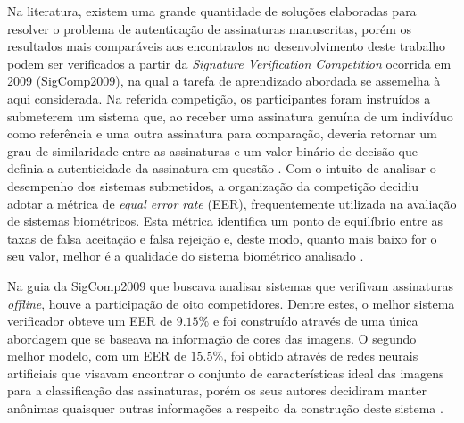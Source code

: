 
Na literatura, existem uma grande quantidade de soluções elaboradas para resolver o problema de autenticação de assinaturas manuscritas, porém os resultados mais comparáveis aos encontrados no desenvolvimento deste trabalho podem ser verificados a partir da \emph{Signature Verification Competition} ocorrida em 2009 (SigComp2009), na qual a tarefa de aprendizado abordada se assemelha à aqui considerada. Na referida competição, os participantes foram instruídos a submeterem um sistema que, ao receber uma assinatura genuína de um indivíduo como referência e uma outra assinatura para comparação, deveria retornar um grau de similaridade entre as assinaturas e um valor binário de decisão que definia a autenticidade da assinatura em questão \cite{icdar2009}. Com o intuito de analisar o desempenho dos sistemas submetidos, a organização da competição decidiu adotar a métrica de \emph{equal error rate} (EER), frequentemente utilizada na avaliação de sistemas biométricos. Esta métrica identifica um ponto de equilíbrio entre as taxas de falsa aceitação e falsa rejeição e, deste modo, quanto mais baixo for o seu valor, melhor é a qualidade do sistema biométrico analisado \cite{capsi}.

Na guia da SigComp2009 que buscava analisar sistemas que verifivam assinaturas \emph{offline}, houve a participação de oito competidores. Dentre estes, o melhor sistema verificador obteve um EER de $9.15\%$ e foi construído através de uma única abordagem que se baseava na informação de cores das imagens. O segundo melhor modelo, com um EER de $15.5\%$, foi obtido através de redes neurais artificiais que visavam encontrar o conjunto de características ideal das imagens para a classificação das assinaturas, porém os seus autores decidiram manter anônimas quaisquer outras informações a respeito da construção deste sistema \cite{icdar2009, volker}.

